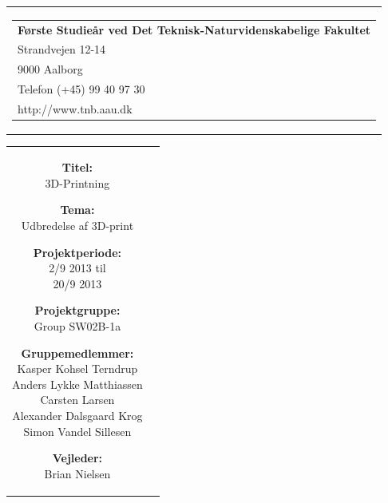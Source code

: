 \thispagestyle{empty}
{\samepage 
\begin{tabular}{r}
	\parbox{\textwidth}{  
	\hfill \parbox{8cm}{\begin{tabular}{l} %
		{\small \textbf{Første Studieår ved Det Teknisk-Naturvidenskabelige Fakultet}}\\
		{\small Strandvejen 12-14} \\
		{\small 9000 Aalborg} \\
		{\small Telefon (+45) 99 40 97 30} \\
		{\small http://www.tnb.aau.dk}
	\end{tabular}}
	}
\end{tabular}

\begin{tabular}{cc}
	\parbox{8cm}{
	\begin{description}
		\item { \textbf{Titel:}}\\ 
			3D-Printning
    		\item { \textbf{Tema:}}\\ 
			Udbredelse af 3D-print
	\end{description}
	
	\parbox{8cm}{
	\begin{description}
		\item { \textbf{Projektperiode:}}\\
			2/9 2013 til\\
			20/9 2013\\
 		\hspace{4cm}
		\item { \textbf{Projektgruppe:}}\\
  			Group SW02B-1a
 		\hspace{4cm}
		\item {\textbf{Gruppemedlemmer:}}\\
			Kasper Kohsel Terndrup\\
			Anders Lykke Matthiassen\\
			Carsten Larsen\\
			Alexander Dalsgaard Krog\\
			Simon Vandel Sillesen\\
		\hspace{2cm}
		\item { \textbf{Vejleder:}}\\
 			Brian Nielsen\\
  	\end{description}
	}

}
\end{tabular}}
